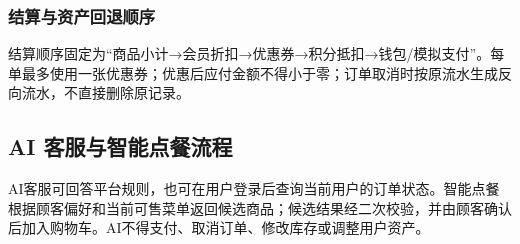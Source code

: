 \subsubsection{结算与资产回退顺序}


结算顺序固定为“商品小计→会员折扣→优惠券→积分抵扣→钱包/模拟支付”。每单最多使用一张优惠券；优惠后应付金额不得小于零；订单取消时按原流水生成反向流水，不直接删除原记录。

\subsection{AI 客服与智能点餐流程}


AI客服可回答平台规则，也可在用户登录后查询当前用户的订单状态。智能点餐根据顾客偏好和当前可售菜单返回候选商品；候选结果经二次校验，并由顾客确认后加入购物车。AI不得支付、取消订单、修改库存或调整用户资产。
